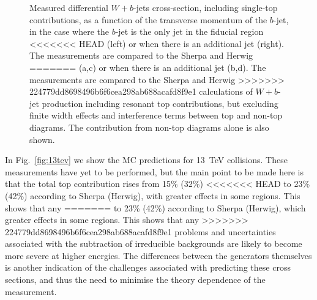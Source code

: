 \documentclass[11pt]{cernrep}
\begin{document}
\begin{figure}
\caption{\label{fig:unsubtracted}
  Measured differential $W+b$-jets cross-section, including single-top contributions, as a function of the
  transverse momentum of the $b$-jet, in the case where the $b$-jet is the only jet in the fiducial region
<<<<<<< HEAD
  (left) or when there is an additional jet (right).  The measurements are compared to the Sherpa and Herwig
=======
  (a,c) or when there is an additional jet (b,d).  The measurements are compared to the Sherpa and Herwig
>>>>>>> 224779dd8698496b6f6cea298ab688acafd8f9e1
  calculations of $W+b$-jet production including resonant top contributions, but excluding finite width effects
  and interference terms between top and non-top diagrams. The contribution from non-top diagrams alone is
  also shown.}
\end{figure}

In Fig.~\ref{fig:13tev} we show the MC predictions for 13~TeV collisions. These measurements have yet to be
performed, but the main point to be made here is that the total top contribution rises from 15\% (32\%)
<<<<<<< HEAD
to 23\% (42\%) according to Sherpa (Herwig), with greater effects in some regions.  This shows that any
=======
to 23\% (42\%) according to Sherpa (Herwig), which greater effects in some regions.  This shows that any
>>>>>>> 224779dd8698496b6f6cea298ab688acafd8f9e1
problems and uncertainties associated with the subtraction of irreducible backgrounds are likely to become
more severe at higher energies. The differences between the generators themselves is another indication of the 
challenges associated with predicting these cross sections, and thus the need to minimise the theory
dependence of the measurement.
  
\end{document}
